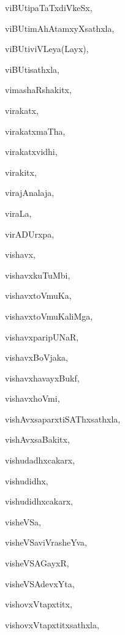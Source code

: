 \begin{multicols}{2}
{viBUtipaTaTxdiVkeSx}, \pageref{viBUtipaTaTxdiVkeSx}

{viBUtimAhAtamxyXsathxla}, \pageref{viBUtimAhAtamxyXsathxla}

{viBUtiviVLeya(Layx)}, \pageref{viBUtiviVLeyaLayx}

{viBUtisathxla}, \pageref{viBUtisathxla}

{vimashaRshakitx}, \pageref{vimashaRshakitx}

{virakatx}, \pageref{virakatx}

{virakatxmaTha}, \pageref{virakatxmaTha}

{virakatxvidhi}, \pageref{virakatxvidhi}

{virakitx}, \pageref{virakitx}

{virajAnalaja}, \pageref{virajAnalaja}

{viraLa}, \pageref{viraLa}

{virADUrxpa}, \pageref{virADUrxpa}

{vishavx}, \pageref{vishavx}

{vishavxkuTuMbi}, \pageref{vishavxkuTuMbi}

{vishavxtoVmuKa}, \pageref{vishavxtoVmuKa}

{vishavxtoVmuKaliMga}, \pageref{vishavxtoVmuKaliMga}

{vishavxparipUNaR}, \pageref{vishavxparipUNaR}

{vishavxBoVjaka}, \pageref{vishavxBoVjaka}

{vishavxhavayxBukf}, \pageref{vishavxhavayxBukf}

{vishavxhoVmi}, \pageref{vishavxhoVmi}

{vishAvxsaparxtiSAThxsathxla}, \pageref{vishAvxsaparxtiSAThxsathxla}

{vishAvxsaBakitx}, \pageref{vishAvxsaBakitx}

{vishudadhxcakarx}, \pageref{vishudadhxcakarx}

{vishudidhx}, \pageref{vishudidhx}

{vishudidhxcakarx}, \pageref{vishudidhxcakarx}

{visheVSa}, \pageref{visheVSa}

{visheVSaviVrasheYva}, \pageref{visheVSaviVrasheYva}

{visheVSAGayxR}, \pageref{visheVSAGayxR}

{visheVSAdevxYta}, \pageref{visheVSAdevxYta}

{vishovxVtapxtitx}, \pageref{vishovxVtapxtitx}

{vishovxVtapxtitxsathxla}, \pageref{vishovxVtapxtitxsathxla}


\end{multicols}
